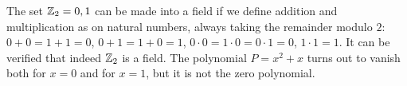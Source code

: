 \begin{example}
The set ${\mathbb Z}_2={0,1}$ can be made into a field 
if we define addition and multiplication as on 
natural numbers, always taking the remainder 
modulo $2$: $0+0=1+1=0$, $0+1=1+0=1$, $0\cdot 0
=1\cdot 0 = 0\cdot 1 = 0$, $1\cdot 1=1$.
It can be verified that indeed ${\mathbb Z}_2$ 
is a field.
The polynomial $P = x^2+x$ turns out to vanish both 
for $x=0$ and for $x=1$, but it is not the zero polynomial.
\end{example}